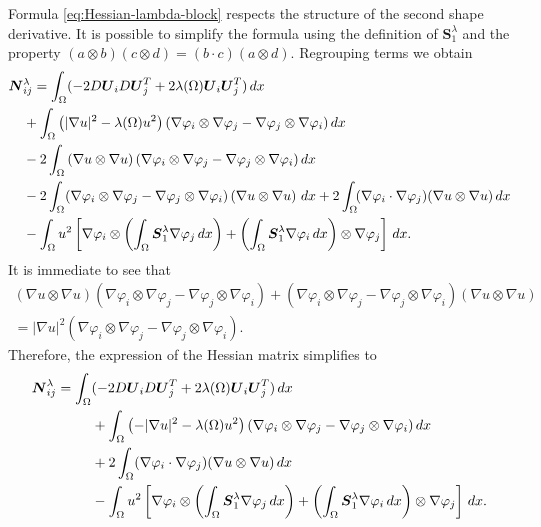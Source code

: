 \documentclass[11pt]{article}
\numberwithin{equation}{section}\newtheorem*{jepEnonce}{\jepEnonceTitle}\newenvironment{enonce*}[1]{\def\jepEnonceTitle{#1}\jepEnonce}{\endjepEnonce}\newtheorem*{conj*}{Conjecture}
\theoremstyle{plain}
\theoremstyle{definition}
\newcommand{\bo}[1]{{\boldsymbol#1}}
\begin{document}
Formula \eqref{eq:Hessian-lambda-block} respects the structure of the second shape derivative. It is possible to simplify the formula using the definition of $\bo S_1^\lambda$ and the property $(a\otimes b)(c\otimes d) = (b\cdot c)(a\otimes d)$. Regrouping terms we obtain
\begin{align*}
\bo N&_{ij}^\lambda  = \int_\Omega (-2D \bo U_i D \bo U_j^T+ 2\lambda(\Omega) \bo U_i \bo U_j^T)\, dx \notag\\
& +\int_\Omega \left(|\nabla u|^2-\lambda(\Omega) u^2\right) (\nabla \varphi_i \otimes \nabla \varphi_j-\nabla \varphi_j \otimes \nabla \varphi_i) \, dx \notag \\
&-2\int_\Omega \left(\nabla u \otimes \nabla u\right) (\nabla \varphi_i \otimes \nabla \varphi_j-\nabla \varphi_j \otimes \nabla \varphi_i) \, dx \notag\\
&-2\int_\Omega (\nabla \varphi_i \otimes \nabla \varphi_j-\nabla \varphi_j \otimes \nabla \varphi_i)\left(\nabla u \otimes \nabla u\right) \, dx +2\int_\Omega\! (\nabla \varphi_i \cdot \nabla \varphi_j)(\nabla u \otimes \nabla u) \, dx \notag \\
& - \int_\Omega u^2\left[\nabla \varphi_i \otimes \left(\int_\Omega \bo S_1^\lambda \nabla \varphi_j \, dx\right)+
\left(\int_\Omega \bo S_1^\lambda \nabla \varphi_i \, dx\right)\otimes \nabla \varphi_j \right]\, dx.
\end{align*}
It is immediate to see that
\vspace*{-5pt}
\begin{multline*} \left(\nabla u \otimes \nabla u\right) (\nabla \varphi_i \otimes \nabla \varphi_j-\nabla \varphi_j \otimes \nabla \varphi_i)+ (\nabla \varphi_i \otimes \nabla \varphi_j-\nabla \varphi_j \otimes \nabla \varphi_i)\left(\nabla u \otimes \nabla u\right)\\
=|\nabla u|^2 (\nabla \varphi_i \otimes \nabla \varphi_j-\nabla \varphi_j \otimes \nabla \varphi_i).
\end{multline*}
Therefore, the expression of the Hessian matrix simplifies to
\begin{align}
\label{eq:Hessian-lambda-exp}
\bo N_{ij}^\lambda  = \int_\Omega& (-2D \bo U_i D \bo U_j^T+ 2\lambda(\Omega) \bo U_i \bo U_j^T)\, dx\\
& +\int_\Omega \left(-|\nabla u|^2-\lambda(\Omega) u^2\right) (\nabla \varphi_i \otimes \nabla \varphi_j-\nabla \varphi_j \otimes \nabla \varphi_i) \, dx \notag \\
& +2\int_\Omega (\nabla \varphi_i \cdot \nabla \varphi_j)(\nabla u \otimes \nabla u) \, dx \notag \\
& - \int_\Omega u^2\left[\nabla \varphi_i \otimes \left(\int_\Omega \bo S_1^\lambda \nabla \varphi_j\, dx \right)+
\left(\int_\Omega \bo S_1^\lambda \nabla \varphi_i\, dx \right)\otimes \nabla \varphi_j \right]\, dx. \notag
\end{align}
\end{document}
